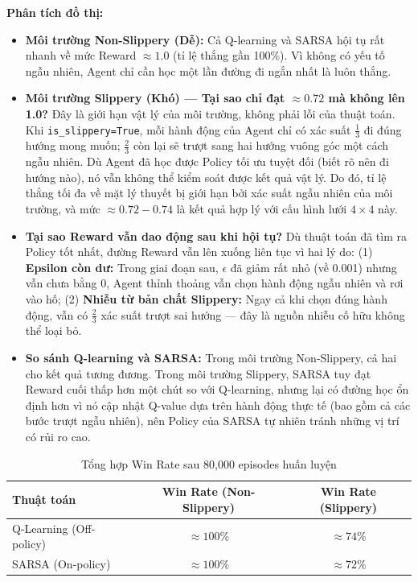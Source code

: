 \textbf{Phân tích đồ thị:}
\begin{itemize}
    \item \textbf{Môi trường Non-Slippery (Dễ):} Cả Q-learning và SARSA hội tụ rất nhanh về mức Reward $\approx 1.0$ (tỉ lệ thắng gần 100\%). Vì không có yếu tố ngẫu nhiên, Agent chỉ cần học một lần đường đi ngắn nhất là luôn thắng.

    \item \textbf{Môi trường Slippery (Khó) — Tại sao chỉ đạt $\approx 0.72$ mà không lên 1.0?}
    Đây là giới hạn vật lý của môi trường, không phải lỗi của thuật toán. Khi \texttt{is\_slippery=True}, mỗi hành động của Agent chỉ có xác suất $\frac{1}{3}$ đi đúng hướng mong muốn; $\frac{2}{3}$ còn lại sẽ trượt sang hai hướng vuông góc một cách ngẫu nhiên. Dù Agent đã học được Policy tối ưu tuyệt đối (biết rõ nên đi hướng nào), nó vẫn không thể kiểm soát được kết quả vật lý. Do đó, tỉ lệ thắng tối đa về mặt lý thuyết bị giới hạn bởi xác suất ngẫu nhiên của môi trường, và mức $\approx 0.72-0.74$ là kết quả hợp lý với cấu hình lưới $4 \times 4$ này.

    \item \textbf{Tại sao Reward vẫn dao động sau khi hội tụ?}
    Dù thuật toán đã tìm ra Policy tốt nhất, đường Reward vẫn lên xuống liên tục vì hai lý do: (1) \textbf{Epsilon còn dư:} Trong giai đoạn sau, $\epsilon$ đã giảm rất nhỏ (về 0.001) nhưng vẫn chưa bằng 0, Agent thỉnh thoảng vẫn chọn hành động ngẫu nhiên và rơi vào hố; (2) \textbf{Nhiễu từ bản chất Slippery:} Ngay cả khi chọn đúng hành động, vẫn có $\frac{2}{3}$ xác suất trượt sai hướng — đây là nguồn nhiễu cố hữu không thể loại bỏ.

    \item \textbf{So sánh Q-learning và SARSA:} Trong môi trường Non-Slippery, cả hai cho kết quả tương đương. Trong môi trường Slippery, SARSA tuy đạt Reward cuối thấp hơn một chút so với Q-learning, nhưng lại có đường học ổn định hơn vì nó cập nhật Q-value dựa trên hành động thực tế (bao gồm cả các bước trượt ngẫu nhiên), nên Policy của SARSA tự nhiên tránh những vị trí có rủi ro cao.
\end{itemize}

\begin{table}[H]
\centering
\begin{tabular}{lcc}
\toprule
\textbf{Thuật toán} & \textbf{Win Rate (Non-Slippery)} & \textbf{Win Rate (Slippery)} \\
\midrule
Q-Learning (Off-policy) & $\approx 100\%$ & $\approx 74\%$ \\
SARSA (On-policy)        & $\approx 100\%$ & $\approx 72\%$ \\
\bottomrule
\end{tabular}
\caption{Tổng hợp Win Rate sau 80,000 episodes huấn luyện}
\label{tab:lab2_results}
\end{table}

